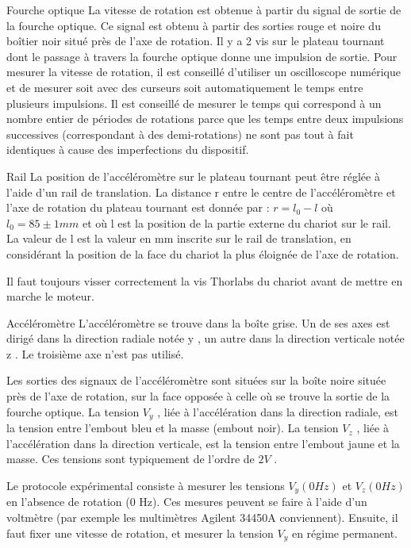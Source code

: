 \documentclass{article}%
\begin{document}
Fourche optique La vitesse de rotation est obtenue à partir du signal de sortie de la fourche optique. Ce signal est obtenu à partir des sorties rouge et noire du boîtier noir situé près de l'axe de rotation. Il y a 2 vis sur le plateau tournant dont le passage à travers la fourche optique donne une impulsion de sortie. Pour mesurer la vitesse de rotation, il est conseillé d'utiliser un oscilloscope numérique et de mesurer soit avec des curseurs soit automatiquement le temps entre plusieurs impulsions. Il est conseillé de mesurer le temps qui correspond à un nombre entier de périodes de rotations parce que les temps entre deux impulsions successives (correspondant à des demi-rotations) ne sont pas tout à fait identiques à cause des imperfections du dispositif.

Rail La position de l'accéléromètre sur le plateau tournant peut être réglée à l'aide d'un rail de translation. La distance r entre le centre de l'accéléromètre et l'axe de rotation du plateau tournant est donnée par  : $r=l_0-l$ où $l_0=85 \pm 1 mm$ et où l est la position de la partie externe du chariot sur le rail. La valeur de l est la valeur en mm inscrite sur le rail de translation, en considérant la position de la face du chariot la plus éloignée de l'axe de rotation.

Il faut toujours visser correctement la vis Thorlabs du chariot avant de mettre en marche le moteur.

Accéléromètre L'accéléromètre se trouve dans la boîte grise. Un de ses axes est dirigé dans la direction radiale notée y , un autre dans la direction verticale notée z . Le troisième axe n'est pas utilisé.

Les sorties des signaux de l'accéléromètre sont situées sur la boîte noire située près de l'axe de rotation, sur la face opposée à celle où se trouve la sortie de la fourche optique. La tension $V_y$ , liée à l'accélération dans la direction radiale, est la tension entre l'embout bleu et la masse (embout noir). La tension $V_z$ , liée à l'accélération dans la direction verticale, est la tension entre l'embout jaune et la masse. Ces tensions sont typiquement de l'ordre de $2 V$ .

Le protocole expérimental consiste à mesurer les tensions $V_y(0Hz)$ et $V_z(0Hz)$ en l'absence de rotation (0 Hz). Ces mesures peuvent se faire à l'aide d'un voltmètre (par exemple les multimètres Agilent 34450A conviennent). Ensuite, il faut fixer une vitesse de rotation, et mesurer la tension $V_y$ en régime permanent.
\end{document}
